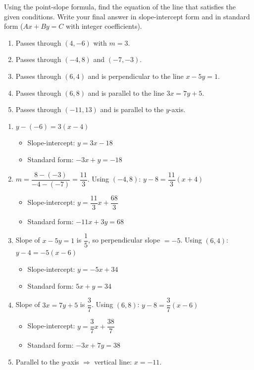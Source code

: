 \documentclass{ximera}
\begin{document}
\begin{problem}
Using the point-slope formula, find the equation of the line that satisfies the given conditions. Write your final answer in slope-intercept form and in standard form ($Ax + By = C$ with integer coefficients).
\begin{enumerate}
  \item[(a)] Passes through $(4,-6)$ with $m = 3$.
  \medskip
  \item[(b)] Passes through $(-4,8)$ and $(-7,-3)$.
  \medskip
  \item[(c)] Passes through $(6,4)$ and is perpendicular to the line $x - 5y = 1$.
  \medskip
  \item[(d)] Passes through $(6,8)$ and is parallel to the line $3x = 7y + 5$.
  \medskip
  \item[(e)] Passes through $(-11,13)$ and is parallel to the $y$-axis.
\end{enumerate}

\begin{solution}
\begin{enumerate}
  \item[(a)] $y - (-6) = 3(x - 4)$
  \begin{itemize}
    \item Slope-intercept: $y = 3x - 18$
    \item Standard form: $-3x + y = -18$
  \end{itemize}

  \item[(b)] $m = \dfrac{8-(-3)}{-4-(-7)} = \dfrac{11}{3}$. Using $(-4,8)$: $y - 8 = \dfrac{11}{3}(x+4)$
  \begin{itemize}
    \item Slope-intercept: $y = \dfrac{11}{3}x + \dfrac{68}{3}$
    \item Standard form: $-11x + 3y = 68$
  \end{itemize}

  \item[(c)] Slope of $x - 5y = 1$ is $\dfrac{1}{5}$, so perpendicular slope $= -5$. Using $(6,4)$: $y - 4 = -5(x-6)$
  \begin{itemize}
    \item Slope-intercept: $y = -5x + 34$
    \item Standard form: $5x + y = 34$
  \end{itemize}

  \item[(d)] Slope of $3x = 7y + 5$ is $\dfrac{3}{7}$. Using $(6,8)$: $y - 8 = \dfrac{3}{7}(x-6)$
  \begin{itemize}
    \item Slope-intercept: $y = \dfrac{3}{7}x + \dfrac{38}{7}$
    \item Standard form: $-3x + 7y = 38$
  \end{itemize}

  \item[(e)] Parallel to the $y$-axis $\Rightarrow$ vertical line: $x = -11$.
\end{enumerate}
\end{solution}
\end{problem}
\end{document}

